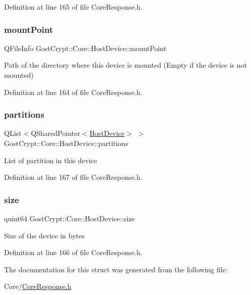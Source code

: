 Definition at line 165 of file Core\+Response.\+h.

\mbox{\label{struct_gost_crypt_1_1_core_1_1_host_device_a591592a14eccfbef276006c08789585b}} 
\subsubsection{\texorpdfstring{mount\+Point}{mountPoint}}
{\footnotesize\ttfamily Q\+File\+Info Gost\+Crypt\+::\+Core\+::\+Host\+Device\+::mount\+Point}

Path of the directory where this device is mounted (Empty if the device is not mounted) 

Definition at line 164 of file Core\+Response.\+h.

\mbox{\label{struct_gost_crypt_1_1_core_1_1_host_device_aa47420a7fe2df4a275e5a17be9fbee2d}} 
\subsubsection{\texorpdfstring{partitions}{partitions}}
{\footnotesize\ttfamily Q\+List$<$Q\+Shared\+Pointer$<$\hyperlink{struct_gost_crypt_1_1_core_1_1_host_device}{Host\+Device}$>$ $>$ Gost\+Crypt\+::\+Core\+::\+Host\+Device\+::partitions}

List of partition in this device 

Definition at line 167 of file Core\+Response.\+h.

\mbox{\label{struct_gost_crypt_1_1_core_1_1_host_device_accd94a05c9922635acf8d9a940fbaaff}} 
\subsubsection{\texorpdfstring{size}{size}}
{\footnotesize\ttfamily quint64 Gost\+Crypt\+::\+Core\+::\+Host\+Device\+::size}

Size of the device in bytes 

Definition at line 166 of file Core\+Response.\+h.



The documentation for this struct was generated from the following file\+:\begin{DoxyCompactItemize}
\item 
Core/\hyperlink{_core_response_8h}{Core\+Response.\+h}\end{DoxyCompactItemize}
